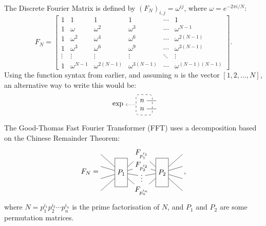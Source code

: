 The Discrete Fourier Matrix is defined by $(F_N)_{i,j}=\omega^{ij}$,
where $\omega = e^{-2\pi i/N}$:
\[
   \renewcommand*{\arraystretch}{1}
F_N =
   \begin{bmatrix}
      1&1&1&1&\cdots &1 \\
      1&\omega&\omega^2&\omega^3&\cdots&\omega^{N-1} \\
      1&\omega^2&\omega^4&\omega^6&\cdots&\omega^{2(N-1)}\\ 1&\omega^3&\omega^6&\omega^9&\cdots&\omega^{3(N-1)}\\
      \vdots&\vdots&\vdots&\vdots&\ddots&\vdots\\
      1&\omega^{N-1}&\omega^{2(N-1)}&\omega^{3(N-1)}&\cdots&\omega^{(N-1)(N-1)}
   \end{bmatrix}
.
\]
Using the function syntax from earlier, and assuming $n$ is the vector $[1, 2, \dots, N]$, an alternative way to write this would be:
\[
\begin{tikzpicture}
    \node (exp) at (-.2,0) {$\exp$};
    
    \begin{scope}[xshift=1cm]
        \draw[dashed, rounded corners] (-.3,-0.5) rectangle (.5,0.5);
        \node(n1) at (0,0.2) {$n$};
        \node(n2) at (0,-0.2) {$n$};
        \draw (n1) -- ++(.7,0);
        \draw (n2) -- ++(.7,0);
    \end{scope}
    
    \draw[densely dotted, <-] (exp.east) -- ++(0.5,0);
\end{tikzpicture}
\]

The Good-Thomas Fast Fourier Transformer (FFT) uses a decomposition based on the Chinese Remainder Theorem:
\[
F_{N} = 
   \begin{tikzpicture}[baseline=-1em, y=1.7em]
      \node[rectangle, draw, minimum height=4em] (P1) at (0,-.5) {$P_1$};
      \node (A) at (1,1) {$F_{p_1^{i_1}}$};
      \node[rectangle, draw, minimum height=4em] (P2) at (2,-.5) {$P_2$};
      \node (B) at (1,0) {$F_{p_2^{i_2}}$};
      \node (C) at (1,-.8) {$\vdots$};
      \node (D) at (1,-2) {$F_{p_n^{i_n}}$};
      \draw (-1,1) -- (P1) -- (A) -- (P2) -- (3, 1);
      \draw (-1,0) -- (P1) -- (B) -- (P2) -- (3, 0);
      \draw (-1,-1) -- (P1) -- (C) -- (P2) -- (3, -1);
      \draw (-1,-2) -- (P1) -- (D) -- (P2) -- (3, -2);
   \end{tikzpicture}
   \,,
\]
where $N = p_1^{i_1} p_2^{i_2} \cdots p_n^{i_n}$ is the prime factorisation of $N$, and $P_1$ and $P_2$ are some permutation matrices.

